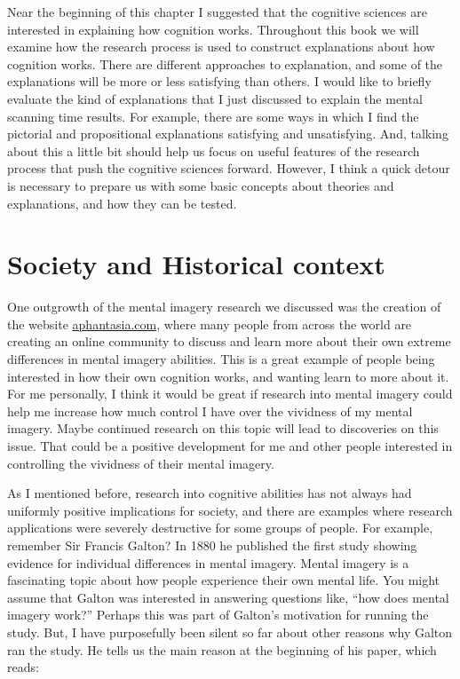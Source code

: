 \documentclass[
  oneside,
  12pt]{crumpbook}
\begin{document}
Near the beginning of this chapter I suggested that the cognitive sciences are interested in explaining how cognition works. Throughout this book we will examine how the research process is used to construct explanations about how cognition works. There are different approaches to explanation, and some of the explanations will be more or less satisfying than others. I would like to briefly evaluate the kind of explanations that I just discussed to explain the mental scanning time results. For example, there are some ways in which I find the pictorial and propositional explanations satisfying and unsatisfying. And, talking about this a little bit should help us focus on useful features of the research process that push the cognitive sciences forward. However, I think a quick detour is necessary to prepare us with some basic concepts about theories and explanations, and how they can be tested.

\hypertarget{society-and-historical-context}{%
\section{Society and Historical context}\label{society-and-historical-context}}

One outgrowth of the mental imagery research we discussed was the creation of the website \url{aphantasia.com}, where many people from across the world are creating an online community to discuss and learn more about their own extreme differences in mental imagery abilities. This is a great example of people being interested in how their own cognition works, and wanting learn to more about it. For me personally, I think it would be great if research into mental imagery could help me increase how much control I have over the vividness of my mental imagery. Maybe continued research on this topic will lead to discoveries on this issue. That could be a positive development for me and other people interested in controlling the vividness of their mental imagery.

As I mentioned before, research into cognitive abilities has not always had uniformly positive implications for society, and there are examples where research applications were severely destructive for some groups of people. For example, remember Sir Francis Galton? In 1880 he published the first study showing evidence for individual differences in mental imagery. Mental imagery is a fascinating topic about how people experience their own mental life. You might assume that Galton was interested in answering questions like, ``how does mental imagery work?'' Perhaps this was part of Galton's motivation for running the study. But, I have purposefully been silent so far about other reasons why Galton ran the study. He tells us the main reason at the beginning of his paper, which reads:
\end{document}
